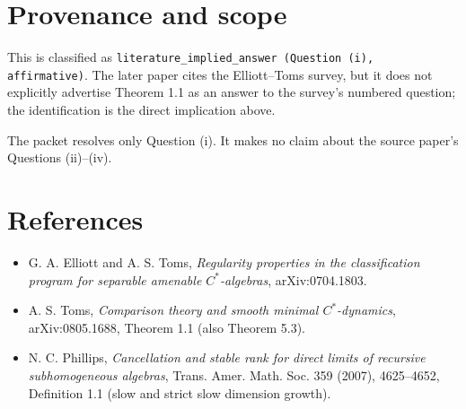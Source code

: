 \documentclass[11pt]{article}
\begin{document}
\section*{Provenance and scope}

This is classified as \texttt{literature\_implied\_answer (Question (i),
affirmative)}.  The later paper cites the Elliott--Toms survey, but it does
not explicitly advertise Theorem 1.1 as an answer to the survey's numbered
question; the identification is the direct implication above.

The packet resolves only Question (i).  It makes no claim about the source
paper's Questions (ii)--(iv).

\section*{References}

\begin{itemize}[leftmargin=*]
\item G. A. Elliott and A. S. Toms, \emph{Regularity properties in the
classification program for separable amenable $C^*$-algebras},
arXiv:0704.1803.
\item A. S. Toms, \emph{Comparison theory and smooth minimal
$C^*$-dynamics}, arXiv:0805.1688, Theorem 1.1 (also Theorem 5.3).
\item N. C. Phillips, \emph{Cancellation and stable rank for direct limits
of recursive subhomogeneous algebras}, Trans. Amer. Math. Soc. 359 (2007),
4625--4652, Definition 1.1 (slow and strict slow dimension growth).
\end{itemize}
\end{document}
